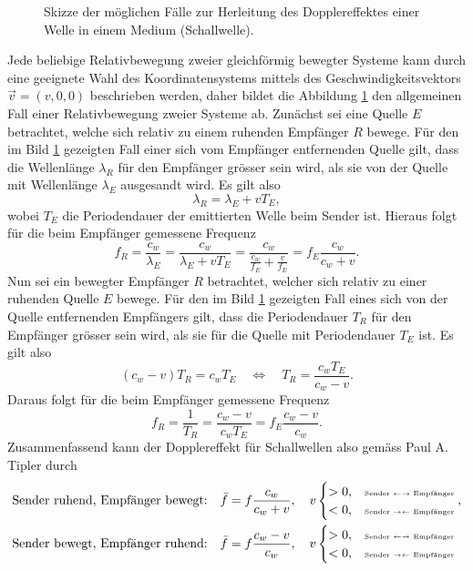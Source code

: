 \documentclass[a4paper,12pt]{article}
\numberwithin{equation}{section}
\begin{document}
\begin{figure}[h]
\begin{tikzpicture}[x=0.75pt,y=0.75pt,yscale=-1,xscale=1]
\end{tikzpicture}

\caption{Skizze der möglichen Fälle zur Herleitung des Dopplereffektes einer Welle in einem Medium (Schallwelle).}
\label{fig:herldopplernonrelschallwellen}
\end{figure} Jede beliebige Relativbewegung zweier gleichförmig bewegter Systeme kann durch eine geeignete Wahl des Koordinatensystems mittels des Geschwindigkeitsvektors $\vec{v} = (v,0,0)$ beschrieben werden, daher bildet die Abbildung \ref{fig:herldopplernonrelschallwellen} den allgemeinen Fall einer Relativbewegung zweier Systeme ab. Zunächst sei eine Quelle $E$ betrachtet, welche sich relativ zu einem ruhenden Empfänger $R$ bewege. Für den im Bild \ref{fig:herldopplernonrelschallwellen} gezeigten Fall einer sich vom Empfänger entfernenden Quelle gilt, dass die Wellenlänge $\lambda_R$ für den Empfänger grösser sein wird, als sie von der Quelle mit Wellenlänge $\lambda_E$ ausgesandt wird. Es gilt also \begin{equation}
\lambda_R = \lambda_E + vT_E,
\end{equation} wobei $T_E$ die Periodendauer der emittierten Welle beim Sender ist. Hieraus folgt für die beim Empfänger gemessene Frequenz \begin{equation}
f_R = \frac{c_w}{\lambda_E} = \frac{c_w}{\lambda_E+vT_E} = \frac{c_w}{\frac{c_w}{f_E}+\frac{v}{f_E}} = f_E\frac{c_w}{c_w+v}.
\end{equation}
Nun sei ein bewegter Empfänger $R$ betrachtet, welcher sich relativ zu einer ruhenden Quelle $E$ bewege. Für den im Bild \ref{fig:herldopplernonrelschallwellen} gezeigten Fall eines sich von der Quelle entfernenden Empfängers gilt, dass die Periodendauer $T_R$ für den Empfänger grösser sein wird, als sie für die Quelle mit Periodendauer $T_E$ ist. Es gilt also \begin{equation}
(c_w-v)T_R = c_wT_E \quad \Leftrightarrow \quad T_R = \frac{c_wT_E}{c_w-v}.
\end{equation} Daraus folgt für die beim Empfänger gemessene Frequenz \begin{equation}
f_R = \frac{1}{T_R} = \frac{c_w-v}{c_wT_E} = f_E\frac{c_w-v}{c_w}.
\end{equation} Zusammenfassend kann der Dopplereffekt für Schallwellen also gemäss Paul A. Tipler durch 
\begin{align}
\text{Sender ruhend, Empfänger bewegt:}\quad \bar{f} =&\; f\frac{c_w}{c_w+v}, \quad v\begin{cases}
> 0, & \text{\tiny \text{Sender} $\leftarrow \rightarrow$ \text{Empfänger}} \\ < 0, & \text{\tiny \text{Sender} $\rightarrow \leftarrow$ \text{Empfänger}}
\end{cases}, \\
\text{Sender bewegt, Empfänger ruhend:}\quad \bar{f} =&\; f\frac{c_w-v}{c_w}, \quad v\begin{cases}
> 0, & \text{\tiny \text{Sender} $\leftarrow \rightarrow$ \text{Empfänger}} \\ < 0, & \text{\tiny \text{Sender} $\rightarrow \leftarrow$ \text{Empfänger}}
\end{cases}
\end{align}
\end{document}
